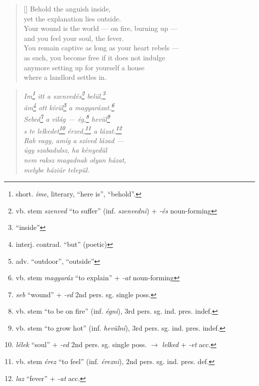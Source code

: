 \documentclass[a4paper,12pt,twoside,final]{book}
\begin{document}

\newpage


\settowidth{\versewidth}{Your wound is the world --- on fire, burning up ---}

\begin{verse}[\versewidth]
  Behold the anguish inside, \\
  yet the explanation lies outside. \\
  Your wound is the world --- on fire, burning up --- \\
  and you feel your soul, the fever. \\
  You remain captive as long as your heart rebels --- \\
  as such, you become free if it does not indulge \\
  anymore setting up for yourself a house \\
  where a landlord settles in.
\end{verse}

\newpage

\settowidth{\versewidth}{}

\begin{verse}%
  \it
  Im\footnote{short. \emph{íme}, literary, ``here is'', ``behold''.}
  itt a szenvedés\footnote{vb. stem \emph{szenved} ``to suffer''
  (inf. \emph{szenvedni}) + \emph{-és} noun-forming} belül,\footnote{``inside''} \\
  ám\footnote{interj. contrad. ``but'' (poetic)} ott
  kívül\footnote{adv. ``outdoor'', ``outside''} a
  magyarázat.\footnote{vb. stem \emph{magyaráz} ``to explain'' +
  \emph{-at} noun-forming} \\
  Sebed\footnote{\emph{seb} ``wound'' + \emph{-ed} 2nd
  pers. sg. single poss.} a világ --- ég,\footnote{vb. stem ``to be
  on fire'' (inf. \emph{égni}), 3rd pers. sg. ind. pres. indef.}
  hevül\footnote{vb. stem ``to grow hot'' (inf. \emph{hevülni}), 3rd
  pers. sg. ind. pres. indef.} \\
  s te lelkedet\footnote{\emph{lélek} ``soul'' + \emph{-ed} 2nd
  pers. sg. single poss. $\rightarrow$ \emph{lelked} + \emph{-et}
  acc.} érzed,\footnote{vb. stem \emph{érez} ``to feel''
  (inf. \emph{érezni}), 2nd pers. sg. ind. pres. def.} a
  lázat.\footnote{\emph{laz} ``fever'' + \emph{-at} acc.} \\
  Rab vagy, amíg a szíved lázad --- \\
  úgy szabadulsz, ha kényedül \\
  nem raksz magadnak olyan házat, \\
  melybe háziúr települ.
\end{verse}

\end{document}
